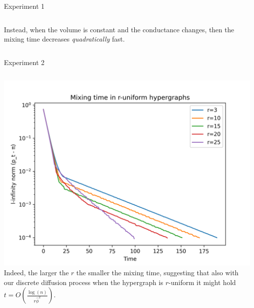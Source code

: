 \documentclass[../main.tex]{subfiles}
\begin{document}
\begin{frame}{Experiment 1}
\begin{columns}
			Instead, when the volume is constant and the conductance changes, then the mixing time decreases \textit{quadratically} fast.
		\end{columns} 
	\end{frame}

	\begin{frame}{Experiment 2}
		\begin{columns}
			\includegraphics[width=1\textwidth]{Figures/mixing_r_uniform_hypergraph}  
			Indeed, the larger the $r$ the smaller the mixing time, suggesting that also with our discrete diffusion process when the hypergraph is $r$-uniform it might hold $t=O\left(\frac{\log(n)}{r\hat{\phi}^2}\right)$.
		\end{columns}
	\end{frame}
\end{document}
